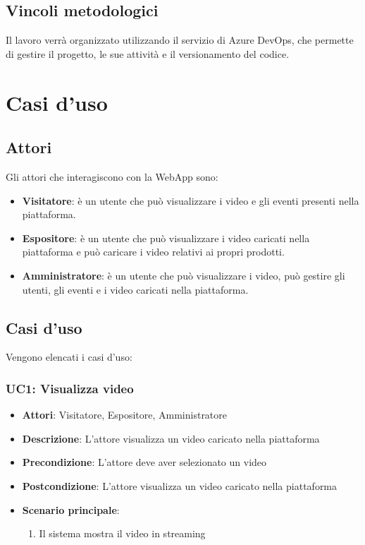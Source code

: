\subsection{Vincoli metodologici}
\label{subsec:vincoli-metodologici}
Il lavoro verrà organizzato utilizzando il servizio di Azure DevOps, che permette di gestire il progetto, le sue attività e il versionamento del codice.\\
\section{Casi d'uso}
\label{sec:casi-duso}
\subsection{Attori}
\label{subsec:attori}
Gli attori che interagiscono con la WebApp sono:
\begin{itemize}
    \item \textbf{Visitatore}: è un utente che può visualizzare i video e gli eventi presenti nella piattaforma.
    \item \textbf{Espositore}: è un utente che può visualizzare i video caricati nella piattaforma e può caricare i video relativi ai propri prodotti.
    \item \textbf{Amministratore}: è un utente che può visualizzare i video, può gestire gli utenti, gli eventi e i video caricati nella piattaforma.
\end{itemize}
\subsection{Casi d'uso}
\label{subsec:casi-duso}
Vengono elencati i casi d'uso:
\subsubsection{UC1: Visualizza video}
\label{subsubsec:uc1}
\begin{itemize}
    \item \textbf{Attori}: Visitatore, Espositore, Amministratore
    \item \textbf{Descrizione}: L'attore visualizza un video caricato nella piattaforma
    \item \textbf{Precondizione}: L'attore deve aver selezionato un video
    \item \textbf{Postcondizione}: L'attore visualizza un video caricato nella piattaforma
    \item \textbf{Scenario principale}:
    \begin{enumerate}
        \item Il sistema mostra il video in streaming
    \end{enumerate}
\end{itemize}

